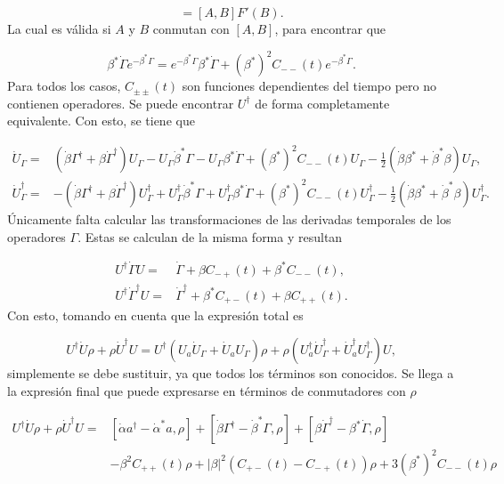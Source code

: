 \documentclass[a4paper,10pt]{report}
\begin{document}
\begin{equation}
[A,F(B)]=[A,B]F'(B).
\end{equation} La cual es válida si $A$ y $B$ conmutan con $[A,B]$, para encontrar que

\begin{equation}
\beta^*\dot{\Gamma} e^{-\beta^* \Gamma} = e^{-\beta^* \Gamma}\beta^*\dot{\Gamma} + (\beta^*)^2 C_{--}(t) e^{-\beta^* \Gamma}.
\end{equation} Para todos los casos, $C_{\pm \pm}(t)$ son funciones dependientes del tiempo pero no contienen operadores. Se puede encontrar $U^\dagger$ de forma completamente equivalente. Con esto, se tiene que

\begin{align}
\dot{U}_\Gamma =&(\dot{\beta}\Gamma^\dagger +\beta \dot{\Gamma}^\dagger)U_\Gamma - U_\Gamma\dot{\beta}^*\Gamma-U_\Gamma\beta^* \dot{\Gamma} + (\beta^*)^2 C_{--}(t)U_\Gamma-\frac{1}{2}(\dot{\beta} \beta^*+\dot{\beta}^* \beta)U_\Gamma, \\
\dot{U}^\dagger_\Gamma=&-(\dot{\beta}\Gamma^\dagger +\beta \dot{\Gamma}^\dagger)U_\Gamma^\dagger + U_\Gamma^\dagger\dot{\beta}^*\Gamma+U_\Gamma^\dagger\beta^* \dot{\Gamma} + (\beta^*)^2 C_{--}(t)U_\Gamma^\dagger-\frac{1}{2}(\dot{\beta} \beta^*+\dot{\beta}^* \beta)U_\Gamma^\dagger.
\end{align} Únicamente falta calcular las transformaciones de las derivadas temporales de los operadores $\Gamma$. Estas se calculan de la misma forma y resultan

\begin{align}
U^{\dagger}\dot{\Gamma}U =& \dot{\Gamma} + \beta C_{-+}(t) +\beta^* C_{--}(t),\\
U^{\dagger}\dot{\Gamma}^\dagger U =& \dot{\Gamma}^\dagger + \beta^* C_{+-}(t) +\beta C_{++}(t). 
\end{align} Con esto, tomando en cuenta que la expresión total es

\begin{equation}
U^\dagger \dot{U} \rho + \rho \dot{U}^\dagger U = U^\dagger(U_a \dot{U}_\Gamma+\dot{U}_a U_\Gamma)\rho + \rho(U_a^\dagger \dot{U}_\Gamma^\dagger+\dot{U}_a^\dagger U_\Gamma^\dagger)U,
\end{equation} simplemente se debe sustituir, ya que todos los términos son conocidos. Se llega a la expresión final que puede expresarse en términos de conmutadores con $\rho$

\begin{align}
U^\dagger \dot{U} \rho + \rho \dot{U}^\dagger U =& [\dot{\alpha}a^\dagger - \dot{\alpha}^* a,\rho] +[\dot{\beta}\Gamma^\dagger - \dot{\beta}^* \Gamma,\rho]+  [\beta\dot{\Gamma}^\dagger - \beta^* \dot{\Gamma},\rho]\\
&-\nonumber\beta^2C_{++}(t)\rho + |\beta|^2(C_{+-}(t) - C_{-+}(t))\rho +3(\beta^*)^2C_{--}(t)\rho
\end{align}






\end{document}

